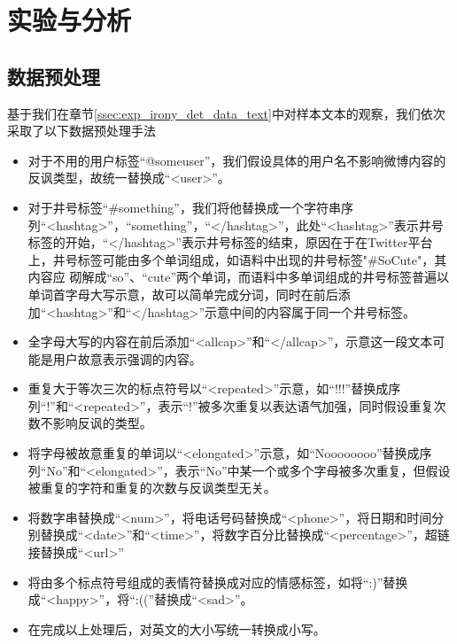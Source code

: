 \section{实验与分析}
\label{sec:exp_irony_det_exp}

\subsection{数据预处理}

基于我们在章节\ref{ssec:exp_irony_det_data_text}中对样本文本的观察，我们依次采取了以下数据预处理手法

\begin{itemize}

\item 对于不用的用户标签“@someuser”，我们假设具体的用户名不影响微博内容的反讽类型，故统一替换成“<user>”。

\item 对于井号标签“\#something”，我们将他替换成一个字符串序列“<hashtag>”，“something”，“</hashtag>”，此处“<hashtag>”表示井号标签的开始，“</hashtag>”表示井号标签的结束，原因在于在Twitter平台上，井号标签可能由多个单词组成，如语料中出现的井号标签"\#SoCute"，其内容应
砌解成“so”、“cute”两个单词，而语料中多单词组成的井号标签普遍以单词首字母大写示意，故可以简单完成分词，同时在前后添加“<hashtag>”和“</hashtag>”示意中间的内容属于同一个井号标签。

\item 全字母大写的内容在前后添加“<allcap>”和“</allcap>”，示意这一段文本可能是用户故意表示强调的内容。

\item 重复大于等次三次的标点符号以“<repeated>”示意，如“!!!”替换成序列“!”和“<repeated>”，表示“!”被多次重复以表达语气加强，同时假设重复次数不影响反讽的类型。

\item 将字母被故意重复的单词以“<elongated>”示意，如“Noooooooo”替换成序列“No”和“<elongated>”，表示“No”中某一个或多个字母被多次重复，但假设被重复的字符和重复的次数与反讽类型无关。

\item 将数字串替换成“<num>”，将电话号码替换成“<phone>”，将日期和时间分别替换成“<date>”和“<time>”，将数字百分比替换成“<percentage>”，超链接替换成“<url>”

\item 将由多个标点符号组成的表情符替换成对应的情感标签，如将“:)”替换成“<happy>”，将“:((”替换成“<sad>”。

\item 在完成以上处理后，对英文的大小写统一转换成小写。

\end{itemize}

